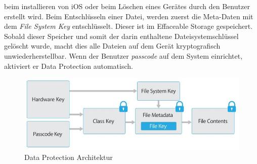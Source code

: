 		beim installieren von iOS oder beim Löschen eines Gerätes durch den Benutzer
		erstellt wird. Beim Entschlüsseln einer Datei, werden zuerst die Meta-Daten
		mit dem \textsl{File System Key} entschlüsselt. Dieser ist im Effaceable Storage
		gespeichert.
		Sobald dieser Speicher und somit der darin enthaltene Dateisystemschlüssel
		gelöscht wurde, macht dies alle Dateien auf dem Gerät kryptografisch
		unwiederherstellbar. Wenn der Benutzer \textsl{passcode} auf dem System
		einrichtet, aktiviert er Data Protection automatisch.
		\begin{figure}[h]
			\centering
			\includegraphics[width=0.9\linewidth]{ios/media/data-protection.jpg}
			\caption{Data Protection Architektur 
			\cite[S.10]{iOSSecurityApr2015}}
			\label{fig:data-protection}
		\end{figure}
